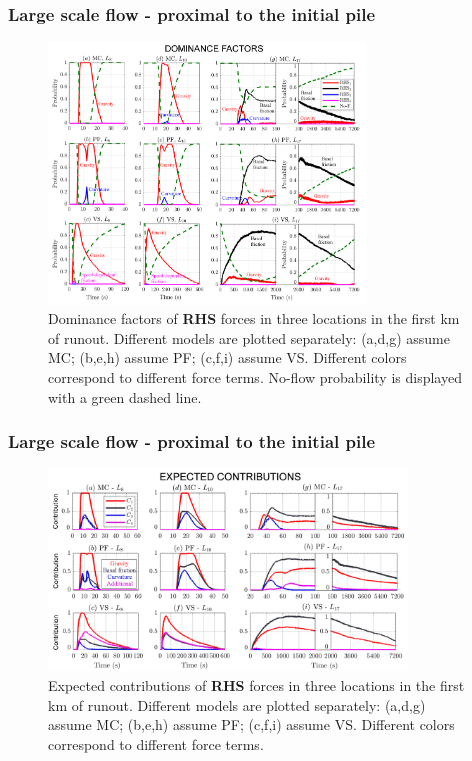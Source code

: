 \documentclass{beamer}
\begin{document}
\begin{frame}
\frametitle{Large scale flow - \small{proximal to the initial pile}}
\begin{figure}
        \includegraphics[width=0.75\textwidth]{figures/Colima/Pr1_total.png}
        \caption{Dominance factors of \textbf{RHS} forces in three locations in the first km of runout. Different models are plotted separately: (a,d,g) assume MC; (b,e,h) assume PF; (c,f,i) assume VS. Different colors correspond to different force terms. No-flow probability is displayed with a green dashed line.}
\end{figure}
\end{frame}

\begin{frame}
\frametitle{Large scale flow - \small{proximal to the initial pile}}
\begin{figure}
        \includegraphics[width=0.85\textwidth]{figures/Colima/Ci1_total.png}
        \small{\caption{Expected contributions of \textbf{RHS} forces in three locations in the first km of runout. Different models are plotted separately: (a,d,g) assume MC; (b,e,h) assume PF; (c,f,i) assume VS. Different colors correspond to different force terms.}}
\end{figure}
\end{frame}
\end{document}
